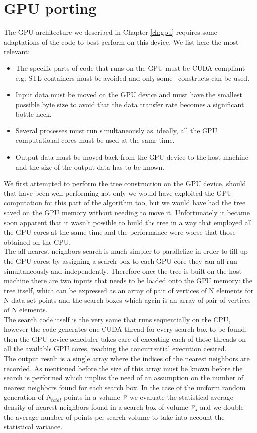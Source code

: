 \section{GPU porting}
The GPU architecture we described in Chapter \ref{ch:gpu} requires some adaptations of the code to best perform on this device. We list here the most relevant:
\begin{itemize}
\item The specific parts of code that runs on the GPU must be CUDA-compliant e.g. STL containers must be avoided and only some \CC\ constructs can be used.
\item Input data must be moved on the GPU device and must have the smallest possible byte size to avoid that the data transfer rate becomes a significant bottle-neck.
\item Several processes must run simultaneously as, ideally, all the GPU computational cores must be used at the same time.
\item Output data must be moved back from the GPU device to the host machine and the size of the output data has to be known.
\end{itemize}
We first attempted to perform the tree construction on the GPU device, should that have been well performing not only we would have exploited the GPU computation for this part of the algorithm too, but we would have had the tree saved on the GPU memory without needing to move it. Unfortunately it became soon apparent that it wasn't possible to build the tree in a way that employed all the GPU cores at the same time and the performance were worse that those obtained on the CPU.\\
The all nearest neighbors search is much simpler to parallelize in order to fill up the GPU cores: by assigning a search box to each GPU core they can all run simultaneously and independently. Therefore once the tree is built on the host machine there are two inputs that needs to be loaded onto the GPU memory: the tree itself, which can be expressed as an array of pair of vertices of N elements for N data set points and the search boxes which again is an array of pair of vertices of N elements.\\
The search code itself is the very same that runs sequentially on the CPU, however the code generates one CUDA thread for every search box to be found, then the GPU device scheduler takes care of executing each of those threads on all the available GPU cores, reaching the concurrential execution desired.\\
The output result is a single array where the indices of the nearest neighbors are recorded. As mentioned before the size of this array must be known before the search is performed which implies the need of an assumption on the number of nearest neighbors found for each search box. In the case of the uniform random generation of $N_{total}$ points in a volume $\mathcal{V}$ we evaluate the statistical average density of nearest neighbors found in a search box of volume $\mathcal{V_s}$ and we double the average number of points per search volume to take into account the statistical variance.

